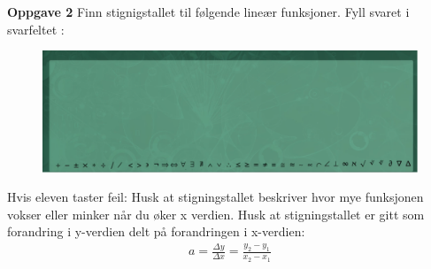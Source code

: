 \documentclass[12pt,twoside,onecolumn]{article}
\begin{document}
\textbf{Oppgave 2} \newline
Finn stignigstallet til følgende lineær funksjoner. Fyll svaret i svarfeltet :
\begin{figure}[h!]
\centering
\includegraphics[scale = 0.3]{figures/Svarfelt.png}
\label{fig:grid}
\end{figure}
{\color{Maroon}Hvis eleven taster feil:} Husk at stigningstallet beskriver hvor mye funksjonen vokser eller minker når du øker x verdien. Husk at stigningstallet er gitt som forandring i y-verdien delt på forandringen i x-verdien:
\begin{align}
a = \frac{\Delta y}{\Delta x} = \frac{y_2 - y_1}{x_2 - x_1}
\end{align}
\end{document}
